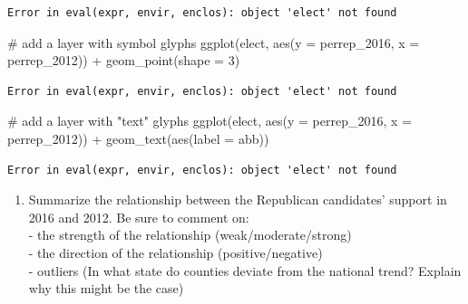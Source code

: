 \documentclass[
  letterpaper,
  DIV=11,
  numbers=noendperiod]{scrreprt}
\newenvironment{Shaded}{\begin{snugshade}}{\end{snugshade}}
\newcommand{\AttributeTok}[1]{\textcolor[rgb]{0.40,0.45,0.13}{#1}}
\newcommand{\CommentTok}[1]{\textcolor[rgb]{0.37,0.37,0.37}{#1}}
\newcommand{\DecValTok}[1]{\textcolor[rgb]{0.68,0.00,0.00}{#1}}
\newcommand{\FunctionTok}[1]{\textcolor[rgb]{0.28,0.35,0.67}{#1}}
\newcommand{\NormalTok}[1]{\textcolor[rgb]{0.00,0.23,0.31}{#1}}
\newcommand{\SpecialCharTok}[1]{\textcolor[rgb]{0.37,0.37,0.37}{#1}}
\providecommand{\tightlist}{%
  \setlength{\itemsep}{0pt}\setlength{\parskip}{0pt}}\usepackage{longtable,booktabs,array}
\begin{document}
\begin{verbatim}
Error in eval(expr, envir, enclos): object 'elect' not found
\end{verbatim}

\begin{Shaded}
\begin{Highlighting}[]
\CommentTok{\# add a layer with symbol glyphs}
\FunctionTok{ggplot}\NormalTok{(elect, }\FunctionTok{aes}\NormalTok{(}\AttributeTok{y =}\NormalTok{ perrep\_2016, }\AttributeTok{x =}\NormalTok{ perrep\_2012)) }\SpecialCharTok{+}
  \FunctionTok{geom\_point}\NormalTok{(}\AttributeTok{shape =} \DecValTok{3}\NormalTok{)}
\end{Highlighting}
\end{Shaded}

\begin{verbatim}
Error in eval(expr, envir, enclos): object 'elect' not found
\end{verbatim}

\begin{Shaded}
\begin{Highlighting}[]
\CommentTok{\# add a layer with "text" glyphs}
\FunctionTok{ggplot}\NormalTok{(elect, }\FunctionTok{aes}\NormalTok{(}\AttributeTok{y =}\NormalTok{ perrep\_2016, }\AttributeTok{x =}\NormalTok{ perrep\_2012)) }\SpecialCharTok{+}
  \FunctionTok{geom\_text}\NormalTok{(}\FunctionTok{aes}\NormalTok{(}\AttributeTok{label =}\NormalTok{ abb))}
\end{Highlighting}
\end{Shaded}

\begin{verbatim}
Error in eval(expr, envir, enclos): object 'elect' not found
\end{verbatim}

\hfill\break

\begin{enumerate}
\def\labelenumi{\alph{enumi}.}
\setcounter{enumi}{1}
\tightlist
\item
  Summarize the relationship between the Republican candidates' support
  in 2016 and 2012. Be sure to comment on:\\
  - the strength of the relationship (weak/moderate/strong)\\
  - the direction of the relationship (positive/negative)\\
  - outliers (In what state do counties deviate from the national trend?
  Explain why this might be the case)
\end{enumerate}
\end{document}
